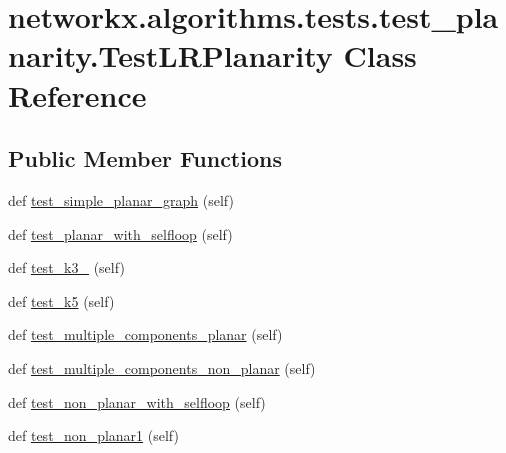 \hypertarget{classnetworkx_1_1algorithms_1_1tests_1_1test__planarity_1_1TestLRPlanarity}{}\section{networkx.\+algorithms.\+tests.\+test\+\_\+planarity.\+Test\+L\+R\+Planarity Class Reference}
\label{classnetworkx_1_1algorithms_1_1tests_1_1test__planarity_1_1TestLRPlanarity}
\subsection*{Public Member Functions}
\begin{DoxyCompactItemize}
\item 
def \hyperlink{classnetworkx_1_1algorithms_1_1tests_1_1test__planarity_1_1TestLRPlanarity_a6a79c7d5f8c1a6aed7ba14590c060869}{test\+\_\+simple\+\_\+planar\+\_\+graph} (self)
\item 
def \hyperlink{classnetworkx_1_1algorithms_1_1tests_1_1test__planarity_1_1TestLRPlanarity_ac5aa6d48328660c4daf554fbc4c2c301}{test\+\_\+planar\+\_\+with\+\_\+selfloop} (self)
\item 
def \hyperlink{classnetworkx_1_1algorithms_1_1tests_1_1test__planarity_1_1TestLRPlanarity_a04df94dbae3824bd212db37aa8ca93a5}{test\+\_\+k3\+\_} (self)
\item 
def \hyperlink{classnetworkx_1_1algorithms_1_1tests_1_1test__planarity_1_1TestLRPlanarity_ad4fd818191978f6e5b5dd03d2cf1f5e5}{test\+\_\+k5} (self)
\item 
def \hyperlink{classnetworkx_1_1algorithms_1_1tests_1_1test__planarity_1_1TestLRPlanarity_af0e59c771b7dd1f184755918736e83fc}{test\+\_\+multiple\+\_\+components\+\_\+planar} (self)
\item 
def \hyperlink{classnetworkx_1_1algorithms_1_1tests_1_1test__planarity_1_1TestLRPlanarity_a1df2ae5d80b820e9021a3a119629e6b3}{test\+\_\+multiple\+\_\+components\+\_\+non\+\_\+planar} (self)
\item 
def \hyperlink{classnetworkx_1_1algorithms_1_1tests_1_1test__planarity_1_1TestLRPlanarity_a02e94093bf88ab3fc87d0a3552254542}{test\+\_\+non\+\_\+planar\+\_\+with\+\_\+selfloop} (self)
\item 
def \hyperlink{classnetworkx_1_1algorithms_1_1tests_1_1test__planarity_1_1TestLRPlanarity_a0fe8061d0197eaf58fcbe8273a7f42a6}{test\+\_\+non\+\_\+planar1} (self)
\item 

\end{DoxyCompactItemize}
